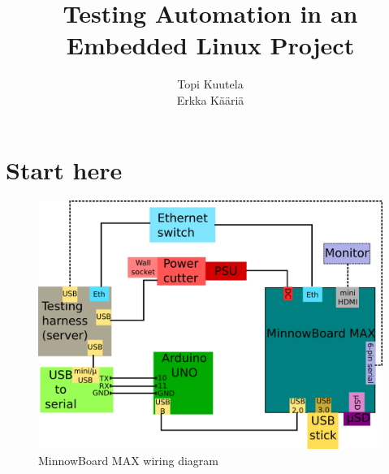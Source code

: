 \documentclass[a4paper,11pt]{article}
\begin{document}


\title{Testing Automation in an Embedded Linux Project}
\author{
	Topi Kuutela\\
	Erkka Kääriä
}
\maketitle

\pagebreak

\tableofcontents

\pagebreak

\section{Start here}

\begin{figure}[h]
	\centering
	\includegraphics[width=0.7\linewidth]{minnowwiring.png}
	\caption{MinnowBoard MAX wiring diagram}
\end{figure}
\end{document}
